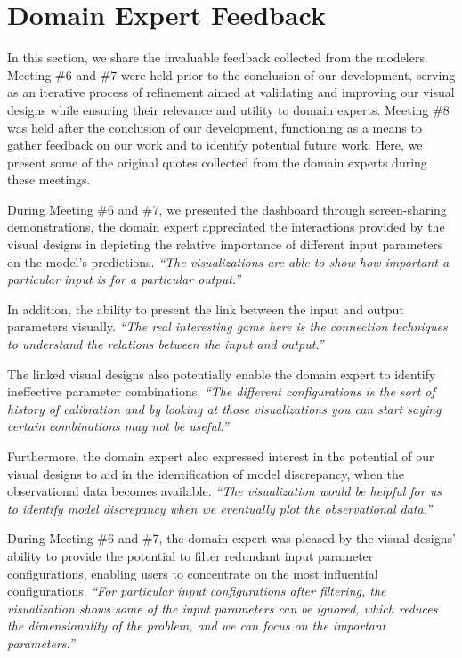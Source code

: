 \section{Domain Expert Feedback}
\label{sec:feedback}
In this section, we share the invaluable feedback collected from the modelers. 
Meeting \#6 and \#7 were held prior to the conclusion of our development, serving as an iterative process of refinement aimed at validating and improving our visual designs while ensuring their relevance and utility to domain experts.
Meeting \#8 was held after the conclusion of our development, functioning as a means to gather feedback on our work and to identify potential future work.
Here, we present some of the original quotes collected from the domain experts during these meetings.


During Meeting \#6 and \#7, we presented the dashboard through screen-sharing demonstrations, the domain expert appreciated the interactions provided by the visual designs in depicting the relative importance of different input parameters on the model's predictions.
\textit{``The visualizations are able to show how important a particular input is for a particular output.''
    }

In addition, the ability to present the link between the input and output parameters visually.
\textit{``The real interesting game here is the connection techniques to understand the relations between the input and output.''
}

The linked visual designs also potentially enable the domain expert to identify ineffective parameter combinations.
\textit{``The different configurations is the sort of history of calibration and by looking at those visualizations you can start saying certain combinations may not be useful.''
}

Furthermore, the domain expert also expressed interest in the potential of our visual designs to aid in the identification of model discrepancy, when the observational data becomes available.
\textit{``The visualization would be helpful for us to identify model discrepancy when we eventually plot the observational data.''
}


During Meeting \#6 and \#7, the domain expert was pleased by the visual designs' ability to provide the potential to filter redundant input parameter configurations, enabling users to concentrate on the most influential configurations.
\textit{``For particular input configurations after filtering, the visualization shows some of the input parameters can be ignored, which reduces the dimensionality of the problem, and we can focus on the important parameters.''
}

